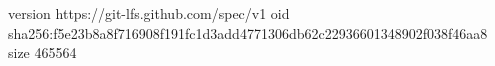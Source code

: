 version https://git-lfs.github.com/spec/v1
oid sha256:f5e23b8a8f716908f191fc1d3add4771306db62c22936601348902f038f46aa8
size 465564
